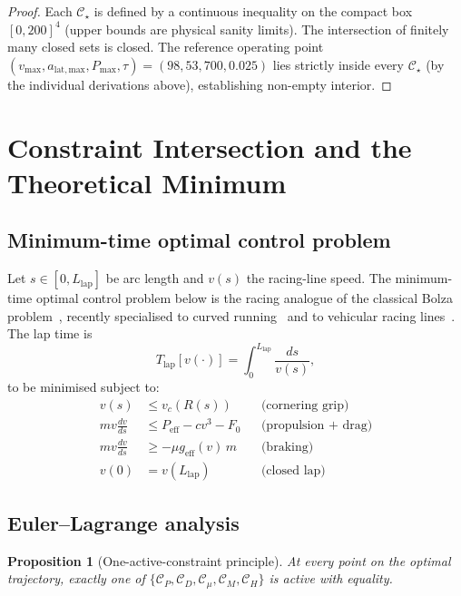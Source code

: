 \documentclass[11pt,twocolumn]{article}
\newtheorem{proposition}[theorem]{Proposition}
\theoremstyle{definition}
\theoremstyle{remark}
\begin{document}
\begin{proof}
Each $\mathcal{C}_\star$ is defined by a continuous inequality on the
compact box $[0, 200]^4$ (upper bounds are physical sanity limits).
The intersection of finitely many closed sets is closed. The reference
operating point $(v_{\max}, a_{\mathrm{lat,max}}, P_{\max}, \tau) =
(98, 53, 700, 0.025)$ lies strictly inside every $\mathcal{C}_\star$ (by the
individual derivations above), establishing non-empty interior.
\end{proof}

\section{Constraint Intersection and the Theoretical Minimum}
\label{sec:intersection}

\subsection{Minimum-time optimal control problem}

Let $s \in [0, L_{\mathrm{lap}}]$ be arc length and $v(s)$ the racing-line
speed. The minimum-time optimal control problem below is the racing analogue
of the classical Bolza problem~\cite{bryson1975,pontryagin1962,bertsekas2005},
recently specialised to curved running~\cite{aftalion2020} and to vehicular
racing lines~\cite{velenis2008,kelly2010,limebeer2015,perantoni2014}. The lap time is
\begin{equation}
  T_{\mathrm{lap}}[v(\cdot)] = \int_0^{L_{\mathrm{lap}}} \frac{ds}{v(s)},
  \label{eq:Tfunctional}
\end{equation}
to be minimised subject to:
\begin{align}
  v(s) &\le v_c(R(s))      &&\text{(cornering grip)}\\
  m v\frac{dv}{ds} &\le P_{\mathrm{eff}} - c v^3 - F_0  &&\text{(propulsion + drag)}\\
  m v\frac{dv}{ds} &\ge -\mu g_{\mathrm{eff}}(v)\,m     &&\text{(braking)}\\
  v(0) &= v(L_{\mathrm{lap}})             &&\text{(closed lap)}
\end{align}

\subsection{Euler--Lagrange analysis}

\begin{proposition}[One-active-constraint principle]
\label{prop:one-active}
At every point on the optimal trajectory, exactly one of
$\{\mathcal{C}_P, \mathcal{C}_D, \mathcal{C}_\mu, \mathcal{C}_M, \mathcal{C}_H\}$
is active with equality.
\end{proposition}
\end{document}
